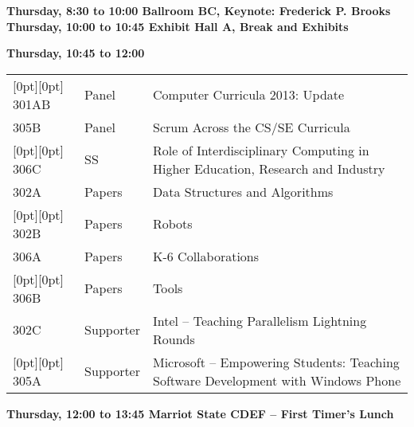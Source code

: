 
\noindent
{\sffamily\bfseries Thursday, 8:30 to 10:00 Ballroom BC, Keynote: Frederick P. Brooks}\newline\noindent
{\sffamily\bfseries Thursday, 10:00 to 10:45 Exhibit Hall A, Break and Exhibits}\newline\noindent

\noindent
{\sffamily\bfseries Thursday, 10:45 to 12:00}\newline\noindent
\begin{tabular*}{5in}{@{}p{0.5in}@{}p{0.75in}@{}p{3.75in}}

\rowcolor[gray]{0.9}[0pt][0pt] 301AB & Panel & Computer Curricula 2013:  Update \\

305B & Panel & Scrum Across the CS/SE Curricula \\

\rowcolor[gray]{0.9}[0pt][0pt] 306C & SS & Role of Interdisciplinary Computing in Higher Education, Research and Industry \\

302A & Papers & Data Structures and Algorithms \\

\rowcolor[gray]{0.9}[0pt][0pt] 302B & Papers & Robots \\

306A & Papers & K-6 Collaborations \\

\rowcolor[gray]{0.9}[0pt][0pt] 306B & Papers & Tools \\

302C & Supporter & Intel  -- Teaching Parallelism Lightning Rounds \\

\rowcolor[gray]{0.9}[0pt][0pt] 305A & Supporter & Microsoft -- Empowering Students: Teaching Software Development with Windows Phone 
\end{tabular*}
{\sffamily\bfseries Thursday, 12:00 to 13:45  Marriot State CDEF -- First Timer's Lunch}\newline

